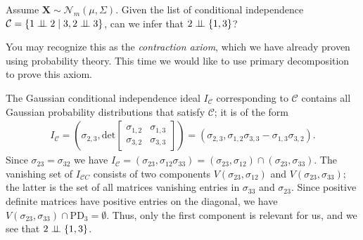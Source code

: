 \begin{eg}
Assume \( \mathbf X \sim \mathcal{N}_m(\mu, \Sigma) \). Given the list of conditional independence \( \mathcal{C} = \left\{ 1 \perp \!\!\! \perp 2 \mid 3, 2 \perp \!\!\! \perp 3 \right\} \), can we infer that \( 2 \perp \!\!\! \perp \left\{ 1,3 \right\} \)?

You may recognize this as the \emph{contraction axiom}, which we have already proven using probability theory. This time we would like to use primary decomposition to prove this axiom. 

The Gaussian conditional independence ideal \( I_{\mathcal{C}} \) corresponding to \( \mathcal{C} \) contains all Gaussian probability distributions that satisfy \( \mathcal{C} \); it is of the form 
\begin{align*}
  I_{\mathcal{C}} = \left(\sigma_{2,3}, \mathrm{det}\begin{bmatrix}
    \sigma_{1,2} & \sigma_{1,3} \\ \sigma_{3,2} & \sigma_{3,3}
  \end{bmatrix}\right) = \left( \sigma_{2,3}, \sigma_{1,2}\sigma_{3,3} - \sigma_{1,3}\sigma_{3,2} \right).
\end{align*}
Since \( \sigma_{23} = \sigma_{32} \) we have \(   I_{\mathcal{C}} = (\sigma_{23},  \sigma_{12} \sigma_{33}) = (\sigma_{23}, \sigma_{12}) \cap (\sigma_{23}, \sigma_{33})\). The vanishing set of \( I_{\mathcal{C}C} \) consists of two components \( V(\sigma_{23}, \sigma_{12}) \) and \( V(\sigma_{23}, \sigma_{33}) \); the latter is the set of all matrices vanishing entries in \( \sigma_{33} \) and \( \sigma_{23} \). Since positive definite matrices have positive entries on the diagonal, we have \( V(\sigma_{23}, \sigma_{33}) \cap \mathrm{PD}_{3} = \emptyset \). Thus, only the first component is relevant for us, and we see that \( 2 \perp \!\!\! \perp \left\{ 1,3 \right\} \).
\end{eg}

